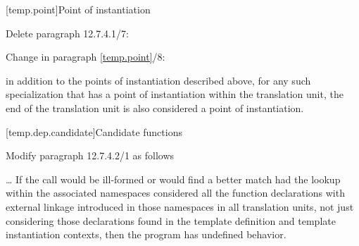 [temp.point]{Point of instantiation}

\noindent
Delete paragraph 12.7.4.1/7:
\begin{std.txt}
\resetalinea[6]
\alinea
{}
\end{std.txt}

\noindent
Change in paragraph \ref{temp.point}/8:
\begin{std.txt}
\resetalinea[7]
\alinea
in addition to the points of instantiation described above, for any such
specialization that has a point of instantiation within the
translation unit,
the end of the translation unit is also
considered a point of instantiation.
\end{std.txt}

[temp.dep.candidate]{Candidate functions}

\noindent
Modify paragraph 12.7.4.2/1 as follows
\begin{std.txt}
\resetalinea[0]
\alinea
\ldots
If the call would be ill-formed or would find a better match had the 
lookup within the associated namespaces considered all the function 
declarations with external   
linkage introduced in those namespaces in all
translation units, not just considering those declarations found in the 
template definition and template instantiation contexts, then the program 
has undefined behavior.
\end{std.txt}



